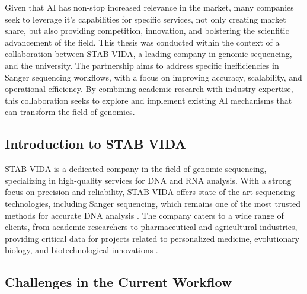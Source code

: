 Given that AI has non-stop increased relevance in the market, many companies seek to leverage it's capabilities for specific services, not only creating market share, but also providing competition, innovation, and bolstering the scienfitic advancement of the field.
This thesis was conducted within the context of a collaboration between STAB VIDA, a leading company in genomic sequencing, and the university. The partnership aims to address specific inefficiencies in Sanger sequencing workflows, with a focus on improving accuracy, scalability, and operational efficiency. By combining academic research with industry expertise, this collaboration seeks to explore and implement existing AI mechanisms that can transform the field of genomics.

\subsection{Introduction to STAB VIDA}

STAB VIDA is a dedicated company in the field of genomic sequencing, specializing in high-quality services for DNA and RNA analysis. With a strong focus on precision and reliability, STAB VIDA offers state-of-the-art sequencing technologies, including Sanger sequencing, which remains one of the most trusted methods for accurate DNA analysis \cite{Sanger1981}. The company caters to a wide range of clients, from academic researchers to pharmaceutical and agricultural industries, providing critical data for projects related to personalized medicine, evolutionary biology, and biotechnological innovations \cite{Fujimura2015}.

\subsection{Challenges in the Current Workflow}

